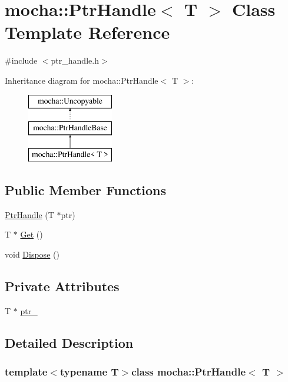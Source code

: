 \hypertarget{classmocha_1_1_ptr_handle}{
\section{mocha::PtrHandle$<$ T $>$ Class Template Reference}
\label{classmocha_1_1_ptr_handle}
}


{\ttfamily \#include $<$ptr\_\-handle.h$>$}

Inheritance diagram for mocha::PtrHandle$<$ T $>$:\begin{figure}[H]
\begin{center}
\leavevmode
\includegraphics[height=3.000000cm]{classmocha_1_1_ptr_handle}
\end{center}
\end{figure}
\subsection*{Public Member Functions}
\begin{DoxyCompactItemize}
\item 
\hyperlink{classmocha_1_1_ptr_handle_a1e1f76b3d5549697e53ac88ee49da904}{PtrHandle} (T $\ast$ptr)
\item 
T $\ast$ \hyperlink{classmocha_1_1_ptr_handle_a13d7e0e99d17ca78de293ba9ea7d3372}{Get} ()
\item 
void \hyperlink{classmocha_1_1_ptr_handle_a578b175bbb0ec3082f8465f1019779a4}{Dispose} ()
\end{DoxyCompactItemize}
\subsection*{Private Attributes}
\begin{DoxyCompactItemize}
\item 
T $\ast$ \hyperlink{classmocha_1_1_ptr_handle_a7269a2c8354affd0b92ea2e16ad10a81}{ptr\_\-}
\end{DoxyCompactItemize}


\subsection{Detailed Description}
\subsubsection*{template$<$typename T$>$class mocha::PtrHandle$<$ T $>$}



